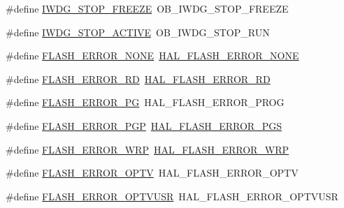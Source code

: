 \begin{DoxyCompactItemize}
\#define \hyperlink{group___h_a_l___f_l_a_s_h___aliased___defines_gafa9a4aaff8763eed2aaeae674dffd159}{I\+W\+D\+G\+\_\+\+S\+T\+O\+P\+\_\+\+F\+R\+E\+E\+ZE}~O\+B\+\_\+\+I\+W\+D\+G\+\_\+\+S\+T\+O\+P\+\_\+\+F\+R\+E\+E\+ZE
\item 
\#define \hyperlink{group___h_a_l___f_l_a_s_h___aliased___defines_gab00290e46777b5c22558554403dee8c4}{I\+W\+D\+G\+\_\+\+S\+T\+O\+P\+\_\+\+A\+C\+T\+I\+VE}~O\+B\+\_\+\+I\+W\+D\+G\+\_\+\+S\+T\+O\+P\+\_\+\+R\+UN
\item 
\#define \hyperlink{group___h_a_l___f_l_a_s_h___aliased___defines_ga12c2b55f5c37a54b5733d005ce82a0de}{F\+L\+A\+S\+H\+\_\+\+E\+R\+R\+O\+R\+\_\+\+N\+O\+NE}~\hyperlink{group___f_l_a_s_h___error___code_gae7fb9ee7198d393aba27ade3a9f50a70}{H\+A\+L\+\_\+\+F\+L\+A\+S\+H\+\_\+\+E\+R\+R\+O\+R\+\_\+\+N\+O\+NE}
\item 
\#define \hyperlink{group___h_a_l___f_l_a_s_h___aliased___defines_gac032c0eace095140c41d6b63b9292dc2}{F\+L\+A\+S\+H\+\_\+\+E\+R\+R\+O\+R\+\_\+\+RD}~\hyperlink{group___f_l_a_s_h___error___code_ga33008f2ad5085cd4158dd260fb2d124d}{H\+A\+L\+\_\+\+F\+L\+A\+S\+H\+\_\+\+E\+R\+R\+O\+R\+\_\+\+RD}
\item 
\#define \hyperlink{group___h_a_l___f_l_a_s_h___aliased___defines_gaf48b018af2eb334ed886221152b674c6}{F\+L\+A\+S\+H\+\_\+\+E\+R\+R\+O\+R\+\_\+\+PG}~H\+A\+L\+\_\+\+F\+L\+A\+S\+H\+\_\+\+E\+R\+R\+O\+R\+\_\+\+P\+R\+OG
\item 
\#define \hyperlink{group___h_a_l___f_l_a_s_h___aliased___defines_ga83c5d3706b564f740672468d1618186d}{F\+L\+A\+S\+H\+\_\+\+E\+R\+R\+O\+R\+\_\+\+P\+GP}~\hyperlink{group___f_l_a_s_h___error___code_ga7132ff3b7f45c0cfe818d61bdb01dc64}{H\+A\+L\+\_\+\+F\+L\+A\+S\+H\+\_\+\+E\+R\+R\+O\+R\+\_\+\+P\+GS}
\item 
\#define \hyperlink{group___h_a_l___f_l_a_s_h___aliased___defines_ga25f249bad0630be8d59b2e4fd5e83e63}{F\+L\+A\+S\+H\+\_\+\+E\+R\+R\+O\+R\+\_\+\+W\+RP}~\hyperlink{group___f_l_a_s_h___error___code_ga27e871d85f9311272098315bc3723075}{H\+A\+L\+\_\+\+F\+L\+A\+S\+H\+\_\+\+E\+R\+R\+O\+R\+\_\+\+W\+RP}
\item 
\#define \hyperlink{group___h_a_l___f_l_a_s_h___aliased___defines_ga88b48ae21a2c56004f16cf62246aa411}{F\+L\+A\+S\+H\+\_\+\+E\+R\+R\+O\+R\+\_\+\+O\+P\+TV}~H\+A\+L\+\_\+\+F\+L\+A\+S\+H\+\_\+\+E\+R\+R\+O\+R\+\_\+\+O\+P\+TV
\item 
\#define \hyperlink{group___h_a_l___f_l_a_s_h___aliased___defines_ga6bcc50c3baf4770eab5bb4bb6c8ca505}{F\+L\+A\+S\+H\+\_\+\+E\+R\+R\+O\+R\+\_\+\+O\+P\+T\+V\+U\+SR}~H\+A\+L\+\_\+\+F\+L\+A\+S\+H\+\_\+\+E\+R\+R\+O\+R\+\_\+\+O\+P\+T\+V\+U\+SR

\end{DoxyCompactItemize}
